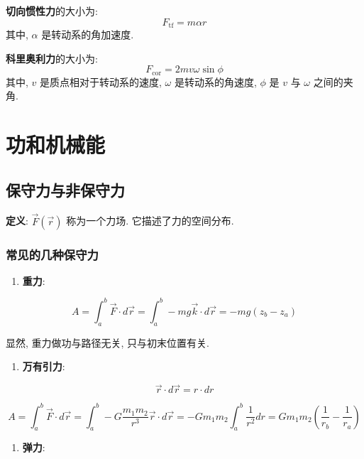 \documentclass[
  a4paper,
]{ctexrep}
\providecommand{\tightlist}{%
  \setlength{\itemsep}{0pt}\setlength{\parskip}{0pt}}
\begin{document}
\textbf{切向惯性力}的大小为: \[F_{\text{tf}} = m \alpha r\] 其中,
\(\alpha\) 是转动系的角加速度.

\textbf{科里奥利力}的大小为: \[F_{\text{cor}} = 2 m v \omega \sin\phi\]
其中, \(v\) 是质点相对于转动系的速度, \(\omega\) 是转动系的角速度,
\(\phi\) 是 \(v\) 与 \(\omega\) 之间的夹角.

\chapter{功和机械能}\label{ux529fux548cux673aux68b0ux80fd}

\section{保守力与非保守力}\label{ux4fddux5b88ux529bux4e0eux975eux4fddux5b88ux529b}

\textbf{定义}: \(\vec{F}(\vec{r})\) 称为一个力场. 它描述了力的空间分布.

\subsection{常见的几种保守力}\label{ux5e38ux89c1ux7684ux51e0ux79cdux4fddux5b88ux529b}

\begin{enumerate}
\def\labelenumi{\arabic{enumi}.}
\tightlist
\item
  \textbf{重力}:
\end{enumerate}

\[ A =\int_{a}^{b} \vec{F} \cdot d\vec{r} = \int_a^b - mg \vec{k} \cdot d\vec{r} = -mg(z_b - z_a) \]

显然, 重力做功与路径无关, 只与初末位置有关.

\begin{enumerate}
\def\labelenumi{\arabic{enumi}.}
\setcounter{enumi}{1}
\tightlist
\item
  \textbf{万有引力}:
\end{enumerate}

\[\vec{r} \cdot d\vec{r} = r \cdot dr\]

\[A = \int_a^b \vec{F} \cdot d\vec{r} = \int_a^b -G \frac{m_1 m_2}{r^3} \vec{r} \cdot d\vec{r} = -G m_1 m_2 \int_a^b \frac{1}{r^2} dr = G m_1 m_2 \left( \frac{1}{r_b} - \frac{1}{r_a} \right)\]

\begin{enumerate}
\def\labelenumi{\arabic{enumi}.}
\setcounter{enumi}{2}
\tightlist
\item
  \textbf{弹力}:
\end{enumerate}
\end{document}
